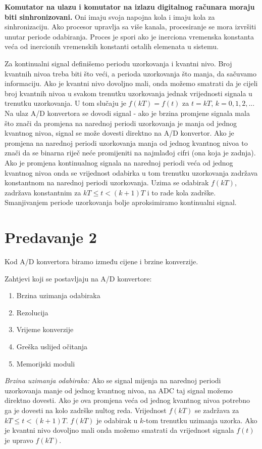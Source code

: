 \documentclass{article}
\newenvironment{defquote}
	{\begin{center}\begin{minipage}{0.9\linewidth}\begin{mdframed}[linewidth=1.2pt]}
		{\end{mdframed}\end{minipage}\end{center}}
\begin{document}
	\textbf{Komutator na ulazu i komutator na izlazu digitalnog računara moraju biti sinhronizovani.} Oni imaju svoja napojna kola i imaju kola za sinhronizaciju. Ako procesor upravlja sa više kanala, procesiranje se mora izvršiti unutar periode odabiranja. Proces je spori ako je inerciona vremenska konstanta veća od inercionih vremenskih konstanti ostalih elemenata u sistemu.
	
	Za kontinualni signal definišemo periodu uzorkovanja i kvantni nivo. Broj kvantnih nivoa treba biti što veći, a perioda uzorkovanja što manja, da sačuvamo informaciju. Ako je kvantni nivo dovoljno mali, onda možemo smatrati da je cijeli broj kvantnih nivoa u svakom trenutku uzorkovanja jednak vrijednosti signala u trenutku uzorkovanja. U tom slučaju je $f(kT) = f(t)$ za $t=kT$, $k=0,1,2,...$ Na ulaz A/D konvertora se dovodi signal - ako je brzina promjene signala mala što znači da promjena na narednoj periodi uzorkovanja je manja od jednog kvantnog nivoa, signal se može dovesti direktno na A/D konvertor. Ako je promjena na narednoj periodi uzorkovanja manja od jednog kvantnog nivoa to znači da se binarna riječ neće promijeniti na najmlađoj cifri (ona koja je zadnja). Ako je promjena kontinualnog signala na narednoj periodi veća od jednog kvantnog nivoa onda se vrijednost odabirka u tom trenutku uzorkovanja zadržava konstantnom na narednoj periodi uzorkovanja. Uzima se odabirak $f(kT)$, zadržava konstantnim za $kT\le t < (k+1)T$ i to rade kola zadrške. Smanjivanjem periode uzorkovanja bolje aproksimiramo kontinualni signal.
	
	\section*{Predavanje 2}
	Kod A/D konvertora biramo između cijene i brzine konverzije.
	\begin{defquote}
		Zahtjevi koji se postavljaju na A/D konvertore:
		\begin{enumerate}
			\item Brzina uzimanja odabiraka
			\item Rezolucija
			\item Vrijeme konverzije
			\item Greška uslijed očitanja
			\item Memorijski moduli
		\end{enumerate}
	\end{defquote}
	
	\textit{Brzina uzimanja odabiraka:} Ako se signal mijenja na  narednoj periodi uzorkovanja manje od jednog kvantnog nivoa, na ADC taj signal možemo direktno dovesti. Ako je ova promjena veća od jednog kvantnog nivoa potrebno ga je dovesti na kolo zadrške nultog reda. Vrijednost $f(kT)$ se zadržava za $kT \le t < (k+1)T$. $f(kT)$ je odabirak u $k$-tom trenutku uzimanja uzorka. Ako je kvantni nivo dovoljno mali onda možemo smatrati da vrijednost signala $f(t)$ je upravo $f(kT)$.
	
\end{document}
